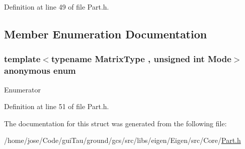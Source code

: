 Definition at line 49 of file Part.\-h.



\subsection{Member Enumeration Documentation}
\hypertarget{structei__traits_3_01_part_3_01_matrix_type_00_01_mode_01_4_01_4_aa87ea8c3475c6335760b0eee25e09bb6}{\subsubsection[{anonymous enum}]{\setlength{\rightskip}{0pt plus 5cm}template$<$typename Matrix\-Type , unsigned int Mode$>$ anonymous enum}}\label{structei__traits_3_01_part_3_01_matrix_type_00_01_mode_01_4_01_4_aa87ea8c3475c6335760b0eee25e09bb6}
\begin{Desc}
\item[Enumerator]\par
\begin{description}
\item[{\em 
\hypertarget{structei__traits_3_01_part_3_01_matrix_type_00_01_mode_01_4_01_4_aa87ea8c3475c6335760b0eee25e09bb6a019399190b7ad69d5d9d88016e228af8}{Flags}\label{structei__traits_3_01_part_3_01_matrix_type_00_01_mode_01_4_01_4_aa87ea8c3475c6335760b0eee25e09bb6a019399190b7ad69d5d9d88016e228af8}
}]\item[{\em 
\hypertarget{structei__traits_3_01_part_3_01_matrix_type_00_01_mode_01_4_01_4_aa87ea8c3475c6335760b0eee25e09bb6ad39ab73f25155b217cb4707027296339}{Coeff\-Read\-Cost}\label{structei__traits_3_01_part_3_01_matrix_type_00_01_mode_01_4_01_4_aa87ea8c3475c6335760b0eee25e09bb6ad39ab73f25155b217cb4707027296339}
}]\end{description}
\end{Desc}


Definition at line 51 of file Part.\-h.



The documentation for this struct was generated from the following file\-:\begin{DoxyCompactItemize}
\item 
/home/jose/\-Code/gui\-Tau/ground/gcs/src/libs/eigen/\-Eigen/src/\-Core/\hyperlink{_part_8h}{Part.\-h}\end{DoxyCompactItemize}
